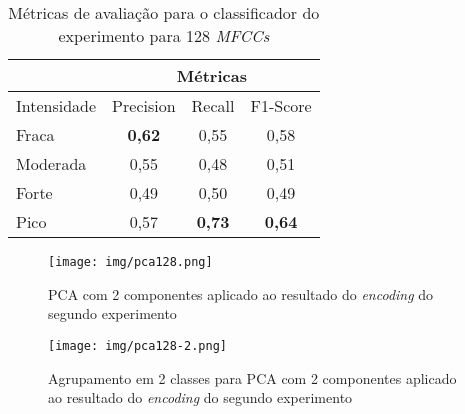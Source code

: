 \begin{table}[h]
    \centering
    \begin{tabular}{l|ccc|}
        \cline{2-4}
                                          & \multicolumn{3}{c|}{Métricas}                                                               \\ \hline
        \multicolumn{1}{|l|}{Intensidade} & \multicolumn{1}{c|}{Precision}      & \multicolumn{1}{c|}{Recall}           & F1-Score      \\ \hline
        \multicolumn{1}{|l|}{Fraca}       & \multicolumn{1}{c|}{\textbf{0,62}}  & \multicolumn{1}{c|}{0,55}             & 0,58          \\ \hline
        \multicolumn{1}{|l|}{Moderada}    & \multicolumn{1}{c|}{0,55}           & \multicolumn{1}{c|}{0,48}             & 0,51          \\ \hline
        \multicolumn{1}{|l|}{Forte}       & \multicolumn{1}{c|}{0,49}           & \multicolumn{1}{c|}{0,50}              & 0,49          \\ \hline
        \multicolumn{1}{|l|}{Pico}        & \multicolumn{1}{c|}{0,57}           & \multicolumn{1}{c|}{\textbf{0,73}}    & \textbf{0,64} \\ \hline
    \end{tabular}
        \caption{\label{table:metricasclf128}Métricas de avaliação para o classificador do experimento para 128 \textit{MFCCs}}
\end{table}

\clearpage

\begin{figure}[h]
    \centering
    \texttt{[image: img/pca128.png]}
    \caption{\label{fig:pca128}PCA com 2 componentes aplicado ao resultado do \textit{encoding} do segundo experimento}
\end{figure}

\begin{figure}[h]
    \centering
    \texttt{[image: img/pca128-2.png]}
    \caption{\label{fig:pca128-2}Agrupamento em 2 classes para PCA com 2 componentes aplicado ao resultado do \textit{encoding} do segundo experimento}
\end{figure}

\clearpage
